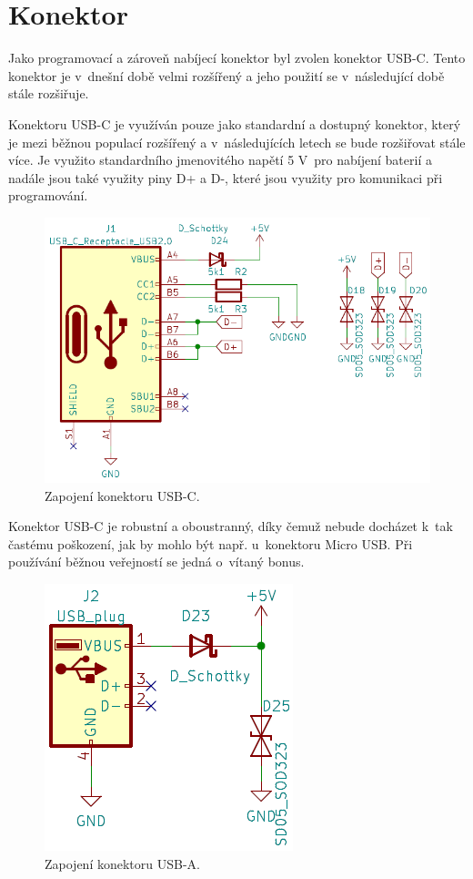 \section{Konektor}
Jako programovací a zároveň nabíjecí konektor byl zvolen konektor USB-C. Tento konektor je v~dnešní době velmi rozšířený a jeho použití se v~následující době stále rozšiřuje. 

Konektoru USB-C je využíván pouze jako standardní a dostupný konektor, který je mezi běžnou
populací rozšířený a v~následujících letech se bude rozšiřovat stále více. Je využito standardního jmenovitého napětí 5 V~pro nabíjení baterií a nadále jsou také využity 
piny D+ a D-, které jsou využity pro komunikaci při programování. 

\begin{figure}[!h]
  \begin{center}
    \includegraphics[scale=0.5]{obrazky/USB_C.png}
  \end{center}
  \caption[Zapojení konektoru USB-C]{Zapojení konektoru USB-C.}
\end{figure}

Konektor USB-C je robustní a oboustranný, díky čemuž nebude docházet k~tak častému poškození, jak by mohlo být např. u~konektoru Micro USB. Při používání běžnou veřejností
se jedná o~vítaný bonus. 

\begin{figure}[!h]
  \begin{center}
    \includegraphics[scale=0.6]{obrazky/USB_A.png}
  \end{center}
  \caption[Zapojení konektoru USB-A]{Zapojení konektoru USB-A.}
\end{figure}

